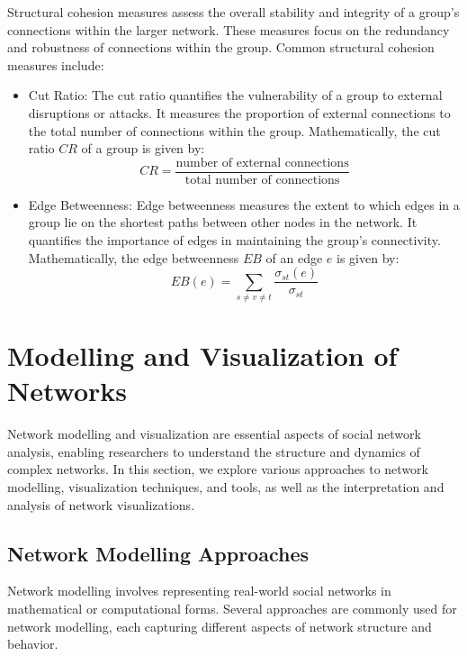 \documentclass[12pt]{book} %
\begin{document}
Structural cohesion measures assess the overall stability and integrity of a group's connections within the larger network. These measures focus on the redundancy and robustness of connections within the group. Common structural cohesion measures include:

\begin{itemize}
    \item Cut Ratio: The cut ratio quantifies the vulnerability of a group to external disruptions or attacks. It measures the proportion of external connections to the total number of connections within the group. Mathematically, the cut ratio \(CR\) of a group is given by:
    \[ CR = \frac{\text{number of external connections}}{\text{total number of connections}} \]
    \item Edge Betweenness: Edge betweenness measures the extent to which edges in a group lie on the shortest paths between other nodes in the network. It quantifies the importance of edges in maintaining the group's connectivity. Mathematically, the edge betweenness \(EB\) of an edge \(e\) is given by:
    \[ EB(e) = \sum_{s \neq v \neq t} \frac{\sigma_{st}(e)}{\sigma_{st}} \]
\end{itemize}


\section{Modelling and Visualization of Networks}

Network modelling and visualization are essential aspects of social network analysis, enabling researchers to understand the structure and dynamics of complex networks. In this section, we explore various approaches to network modelling, visualization techniques, and tools, as well as the interpretation and analysis of network visualizations.

\subsection{Network Modelling Approaches}

Network modelling involves representing real-world social networks in mathematical or computational forms. Several approaches are commonly used for network modelling, each capturing different aspects of network structure and behavior.
\end{document}
